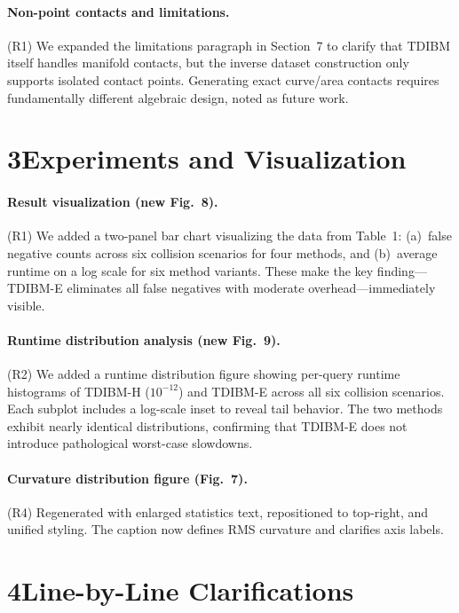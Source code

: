 \documentclass{article}
\begin{document}
\paragraph{Non-point contacts and limitations.}
(R1) We expanded the limitations paragraph in Section~7 to clarify that TDIBM itself handles manifold contacts, but the inverse dataset construction only supports isolated contact points. Generating exact curve/area contacts requires fundamentally different algebraic design, noted as future work.

\section*{3\quad Experiments and Visualization}

\paragraph{Result visualization (new Fig.~8).}
(R1) We added a two-panel bar chart visualizing the data from Table~1: (a)~false negative counts across six collision scenarios for four methods, and (b)~average runtime on a log scale for six method variants. These make the key finding---TDIBM-E eliminates all false negatives with moderate overhead---immediately visible.

\paragraph{Runtime distribution analysis (new Fig.~9).}
(R2) We added a runtime distribution figure showing per-query runtime histograms of TDIBM-H ($10^{-12}$) and TDIBM-E across all six collision scenarios. Each subplot includes a log-scale inset to reveal tail behavior. The two methods exhibit nearly identical distributions, confirming that TDIBM-E does not introduce pathological worst-case slowdowns.

\paragraph{Curvature distribution figure (Fig.~7).}
(R4) Regenerated with enlarged statistics text, repositioned to top-right, and unified styling. The caption now defines RMS curvature and clarifies axis labels.

\section*{4\quad Line-by-Line Clarifications}
\end{document}

